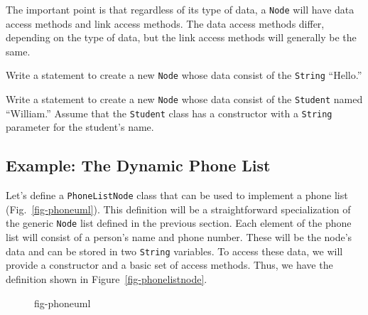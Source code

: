 The important point is that regardless of its type of data, a
{\tt Node} will have data access methods and link access methods.  The data
access methods differ, depending on the type of data, but the link
access methods will generally be the same.


\label{self-study-exercises}
\begin{SSTUDY}
\item  Write a statement to create a new {\tt Node} whose data
consist of the {\tt String} ``Hello.''

\item  Write a statement to create a new {\tt Node} whose data
consist of the {\tt Student} named ``William.''  Assume that the {\tt Student}
class has a constructor with a {\tt String} parameter for the student's name.
\end{SSTUDY}

\subsection{Example: The Dynamic Phone List}


\noindent Let's define a {\tt PhoneListNode} class that can be used to
implement a phone list (Fig.~\ref{fig-phoneuml}).  This definition
will be a straightforward specialization of the generic {\tt Node}
list defined in the previous section.  Each element of the phone list
will consist of a person's name and phone number.  These will be the
node's data and can be stored in two {\tt String} variables.  To
access these data, we will provide a
constructor and a basic set of access methods.  Thus, we have the
definition shown in Figure~\ref{fig-phonelistnode}.

\begin{figure}[t]
 {fig-phoneuml}
\end{figure}

